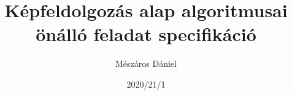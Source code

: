 \documentclass[12pt, draft]{article}
\begin{document}
\title{Képfeldolgozás alap algoritmusai önálló feladat specifikáció}
\author{Mészáros Dániel}
\date{2020/21/1}
\maketitle
\end{document}
